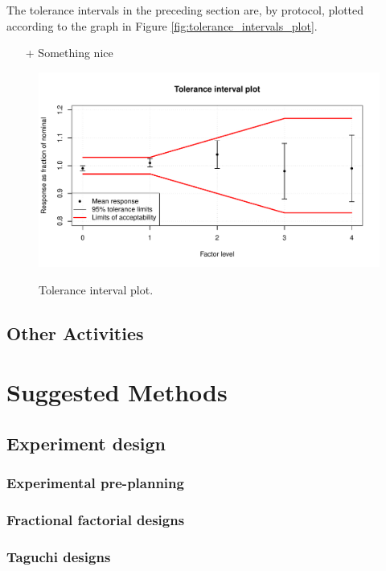 \documentclass[11pt,a4paper,article]{memoir} %
\begin{document}
The tolerance intervals in the preceding section are, by protocol, plotted according to the graph in Figure \ref{fig:tolerance_intervals_plot}. 
\begin{itemize}
\item[+] Something nice
\end{itemize}
\begin{figure}
	\includegraphics[width=\textwidth]{tolerance_intervals_plot.pdf}
	\label{tolerance_intervals_plot}
	\caption{Tolerance interval plot.}
\end{figure}

\section{Other Activities}

\chapter{Suggested Methods}\label{suggested_methods}
\section{Experiment design}
\subsection*{Experimental pre-planning}
\subsection*{Fractional factorial designs}
\subsection*{Taguchi designs}
\end{document}
